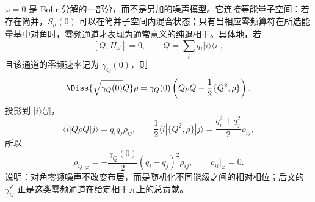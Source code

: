 $\omega=0$ 是 Bohr 分解的一部分，而不是另加的噪声模型。它连接等能量子空间：若存在简并，$S_\mu(0)$ 可以在简并子空间内混合状态；只有当相应零频算符在所选能量基中对角时，零频通道才表现为通常意义的纯退相干。具体地，若
\[
[Q,H_S]=0,
\qquad
Q=\sum_iq_i|i\rangle\langle i|,
\]
且该通道的零频速率记为 $\gamma_Q(0)$，则
\[
\Diss{\sqrt{\gamma_Q(0)}Q}\rho
=\gamma_Q(0)\left(Q\rho Q-\frac12\{Q^2,\rho\}\right).
\]
投影到 $|i\rangle\langle j|$，
\[
\langle i|Q\rho Q|j\rangle=q_iq_j\rho_{ij},
\qquad
\frac12\langle i|\{Q^2,\rho\}|j\rangle
=\frac{q_i^2+q_j^2}{2}\rho_{ij},
\]
所以
\begin{equation}
\dot\rho_{ij}\big|_\varphi
=-\frac{\gamma_Q(0)}2(q_i-q_j)^2\rho_{ij},
\qquad
\dot\rho_{ii}\big|_\varphi=0.
\label{eq:phys-oqs-zero-frequency-dephasing}
\end{equation}
 说明：对角零频噪声不改变布居，而是随机化不同能级之间的相对相位；后文的 $\gamma_{ij}^{\varphi}$ 正是这类零频通道在给定相干元上的总贡献。

